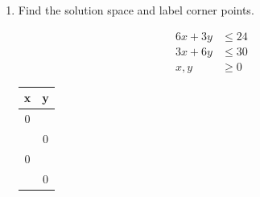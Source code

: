 \documentclass[14pt]{extarticle}
\begin{document}
\begin{enumerate}
	\item Find the solution space and label corner points.
	\begin{multicols}{2}
		\begin{align*}
			6x+3y &\leq 24 \\
			3x + 6y &\leq 30 \\
			x,y &\geq 0
		\end{align*}
		\vfill\null
		\columnbreak
		\begin{tabular}{c|c}
			x & y \\ \hline
			0 &  \\
			& 0 \\ \hline
			0 &  \\
			& 0
		\end{tabular}
		\vfill\null
	\end{multicols}
	
	

	
	
\end{enumerate}

\cleardoublepage
\end{document}
